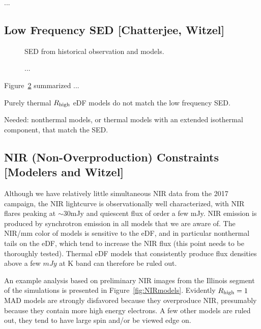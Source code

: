 \documentclass[twocolumn,tighten,dvipsnames,linenumbers]{aastex63}
\begin{document}
...

\subsection{Low Frequency SED
  [Chatterjee, Witzel]}
\label{sec:lfconst}

\begin{figure}
  \caption{SED from historical observation and models.}
  \label{fig:SED}
\end{figure}

\begin{figure}
  \caption{...}
  \label{fig:SED}
\end{figure}

Figure~\ref{fig:SED} summarized ...

Purely thermal ${R_\mathrm{high}}$ eDF models do not match the low frequency SED.

Needed: nonthermal models, or thermal models with an extended isothermal component, that match the SED.

\subsection{NIR (Non-Overproduction) Constraints
  [Modelers and Witzel]}
\label{sec:nirconst}

Although we have relatively little simultaneous NIR data from the 2017 campaign, the NIR lightcurve is observationally well characterized, with NIR flares peaking at $\sim 30$mJy and quiescent flux of order a few mJy.  NIR emission is produced by synchrotron emission in all models that we are aware of.  The NIR/mm color of models is sensitive to the eDF, and in particular nonthermal tails on the eDF, which tend to increase the NIR flux (this point needs to be thoroughly tested).  Thermal eDF models that consistently produce flux densities above a few $mJy$ at K band can therefore be ruled out.

An example analysis based on preliminary NIR images from the Illinois segment of the simulations is presented in Figure~\ref{fig:NIRmodels}.  Evidently ${R_\mathrm{high}} = 1$ MAD models are strongly disfavored because they overproduce NIR, presumably because they contain more high energy electrons.  A few other models are ruled out, they tend to have large spin and/or be viewed edge on.
\end{document}
